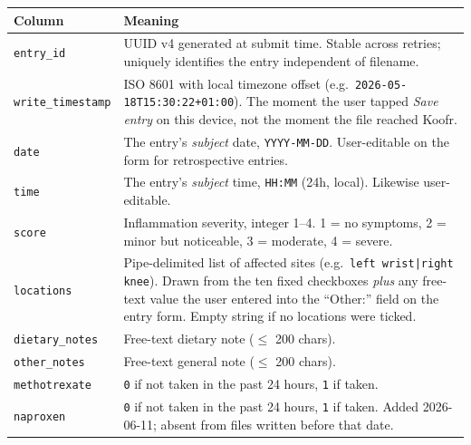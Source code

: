 \documentclass[11pt,a4paper]{article}
\begin{document}
\begin{center}
\small
\renewcommand{\arraystretch}{1.3}
\begin{tabularx}{\linewidth}{l X}
\textbf{Column} & \textbf{Meaning} \\ \hline
\texttt{entry\_id}     & UUID v4 generated at submit time. Stable across retries; uniquely identifies the entry independent of filename. \\
\texttt{write\_timestamp} & ISO 8601 with local timezone offset (e.g.\ \texttt{2026-05-18T15:30:22+01:00}). The moment the user tapped \emph{Save entry} on this device, not the moment the file reached Koofr. \\
\texttt{date}          & The entry's \emph{subject} date, \texttt{YYYY-MM-DD}. User-editable on the form for retrospective entries. \\
\texttt{time}          & The entry's \emph{subject} time, \texttt{HH:MM} (24h, local). Likewise user-editable. \\
\texttt{score}         & Inflammation severity, integer 1--4. 1 = no symptoms, 2 = minor but noticeable, 3 = moderate, 4 = severe. \\
\texttt{locations}     & Pipe-delimited list of affected sites (e.g.\ \texttt{left wrist|right knee}). Drawn from the ten fixed checkboxes \emph{plus} any free-text value the user entered into the ``Other:'' field on the entry form. Empty string if no locations were ticked. \\
\texttt{dietary\_notes} & Free-text dietary note ($\leq$ 200 chars). \\
\texttt{other\_notes}   & Free-text general note ($\leq$ 200 chars). \\
\texttt{methotrexate}   & \texttt{0} if not taken in the past 24 hours, \texttt{1} if taken. \\
\texttt{naproxen}       & \texttt{0} if not taken in the past 24 hours, \texttt{1} if taken. Added 2026-06-11; absent from files written before that date. \\
\end{tabularx}
\end{center}
\end{document}
